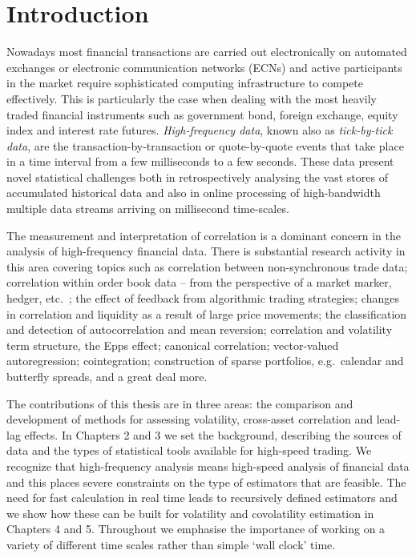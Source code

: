 \chapter{Introduction}\label{chap:introduction}
Nowadays most financial transactions are carried out electronically on automated exchanges or electronic communication networks (ECNs) and active participants in the market require sophisticated computing infrastructure to compete effectively.  This is particularly the case when dealing with the most heavily traded financial instruments such as government bond, foreign exchange, equity index and interest rate futures.  \textit{High-frequency data}, known also as \textit{tick-by-tick data}, are the transaction-by-transaction or quote-by-quote events that take place in a time interval from a few milliseconds to a few seconds.  These data present novel statistical challenges both in retrospectively analysing the vast stores of accumulated historical data and also in online processing of high-bandwidth multiple data streams arriving on millisecond time-scales.

The measurement and interpretation of correlation is a dominant concern in the analysis of high-frequency financial data. There is substantial research activity in this area covering topics such as correlation between non-synchronous trade data; 
correlation within order book data -- from the perspective of a market marker, hedger, etc.\ ; 
the effect of feedback from algorithmic trading strategies; 
changes in correlation and liquidity as a result of large price movements; 
the classification and detection of autocorrelation and mean reversion; 
correlation and volatility term structure, the Epps effect; 
canonical correlation;  vector-valued autoregression;  cointegration; construction of sparse portfolios, e.g.\ calendar and butterfly spreads, and a great deal more. 

The contributions of this thesis are in three areas: the comparison and development of methods for assessing volatility, cross-asset correlation and lead-lag effects.  In Chapters 2 and 3 we set the background, describing the sources of data and the types of statistical tools available for high-speed trading. We recognize that high-frequency analysis means high-speed analysis of
financial data and this places severe constraints on the type of estimators that are feasible. The need for fast calculation in real time 
leads to recursively defined estimators and we show how these can be built for volatility and covolatility estimation in Chapters 4 and 5. Throughout we emphasise the importance of working on a variety of different time scales rather than simple `wall clock' time.

